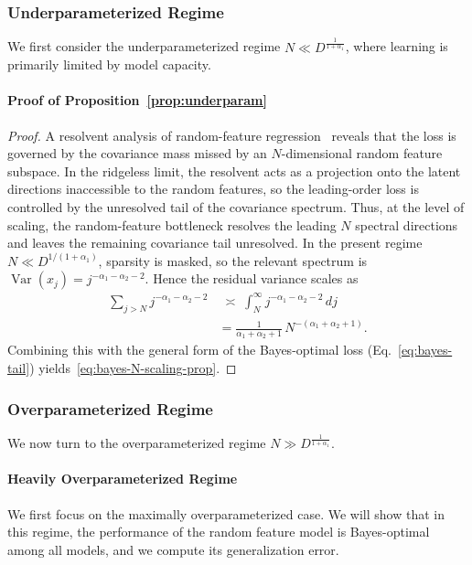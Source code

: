 \documentclass[11pt]{article}
\theoremstyle{plain}
\theoremstyle{definition}
\theoremstyle{remark}
\begin{document}
\subsubsection{Underparameterized Regime}
We first consider the underparameterized regime \( N \ll D^{\frac{1}{1+\alpha_1}} \),  where learning is primarily limited by model capacity.


\paragraph{Proof of Proposition~\ref{prop:underparam}}

\begin{proof} A resolvent analysis of random-feature regression~\citep{Maloney2022SolvableScaling} reveals that the loss is governed by the covariance mass missed by an $N$-dimensional random feature subspace. In the ridgeless limit, the resolvent acts as a projection onto the latent directions inaccessible to the random features, so the leading-order loss is controlled by the unresolved tail of the covariance spectrum. Thus, at the level of scaling, the random-feature bottleneck resolves the leading $N$ spectral directions and leaves the remaining covariance tail unresolved. In the present regime $N\ll D^{1/(1+\alpha_1)}$, sparsity is masked, so the relevant spectrum is $\operatorname{Var}(x_j)=j^{-\alpha_1-\alpha_2-2}$. Hence the residual variance scales as
\begin{align*}
\sum_{j > N} j^{-\alpha_1 - \alpha_2 - 2}
&\;\asymp\;
\int_N^\infty j^{-\alpha_1 - \alpha_2 - 2}\, dj \\
&=
\frac{1}{\alpha_1 + \alpha_2 + 1}
\, N^{-(\alpha_1 + \alpha_2 + 1)}.
\end{align*}
Combining this with the general form of the Bayes-optimal loss 
(Eq.~\eqref{eq:bayes-tail}) yields~\eqref{eq:bayes-N-scaling-prop}.
\end{proof}



\subsubsection{Overparameterized Regime}
We now turn to the overparameterized regime \( N \gg D^{\frac{1}{1+\alpha_1}} \).

\paragraph{Heavily Overparameterized Regime}
We first focus on the maximally overparameterized case. We will show that in this regime, the performance of the random feature model is Bayes-optimal among all models, and we compute its generalization error.
 
\end{document}
